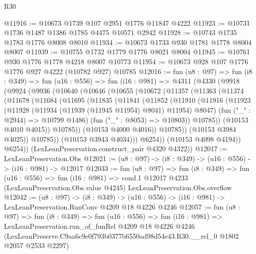 \begin{lexlean}{R30}
\begin{coremodule}
@11916 := @10673 @1739 @107 @2951 @1776 @11847 @4222
@11923 := @10731 @1736 @1487 @1386 @1785 @4475 @10571 @2942
@11928 := @10743 @1735 @1783 @1776 @8008 @8010
@11934 := @10673 @1733 @930 @1781 @1778 @8004 @8007
@11939 := @10755 @1732 @1779 @1776 @8021 @8004
@11945 := @10761 @930 @1776 @1778 @4218 @8007 @10773
@11954 := @10673 @928 @107 @1776 @1776 @927 @4222 (@10782 @927) @10785
@12016 := fun (u8 : @97) =>
  fun (i8 : @349) =>
  fun (u16 : @556) =>
  fun (i16 : @981) =>
  @4311
    (@4330
      (@9918
        (@9924
          (@9936
            (@10640
              (@10646
                (@10655
                  (@10672
                    (@11357
                      (@11363
                        (@11374
                          (@11678
                            (@11684
                              (@11695
                                (@11835
                                  (@11841
                                    (@11852
                                      (@11910
                                        (@11916
                                          (@11923
                                            (@11928
                                              (@11934 (@11939 (@11945 @11954) @8041) @11954)
                                              @8047)
                                            (fun ("_" : @2944) => @10799 @1486)
                                            (fun ("_" : @8053) => @10803))
                                          @10785))
                                      (@10153 @4010 @4015))
                                    @10785))
                                (@10153 @4000 @4016))
                              @10785))
                          (@10153 @3984 @4025))
                        @10785))
                    (@10153 @3943 @4034)))
                @6254))
            (@10153 @4098 @4194))
          @6254))
      (LexLeanPreservation.construct_pair @4320 @4322))
@12017 := LexLeanPreservation.Obs
@12021 := (u8 : @97) -> (i8 : @349) -> (u16 : @556) -> (i16 : @981) -> @12017
@12033 := fun (u8 : @97) =>
  fun (i8 : @349) =>
  fun (u16 : @556) =>
  fun (i16 : @981) =>
  cond.{1} @12017 @4233 (LexLeanPreservation.Obs.value @4245) LexLeanPreservation.Obs.overflow
@12042 := (u8 : @97) ->
  (i8 : @349) -> (u16 : @556) -> (i16 : @981) -> LexLeanPreservation.RunConv @4209 @18 @4226 @4246
@12057 := fun (u8 : @97) =>
  fun (i8 : @349) =>
  fun (u16 : @556) =>
  fun (i16 : @981) =>
  LexLeanPreservation.run_of_funRel
    @4209
    @18
    @4226
    @4246
    (LexLeanPreserve.C9aa6c9e0f793b0377b6550ad98d54e43.R30.__rel_0 @1802 @2057 @2533 @2297)
\end{coremodule}
\end{lexlean}

